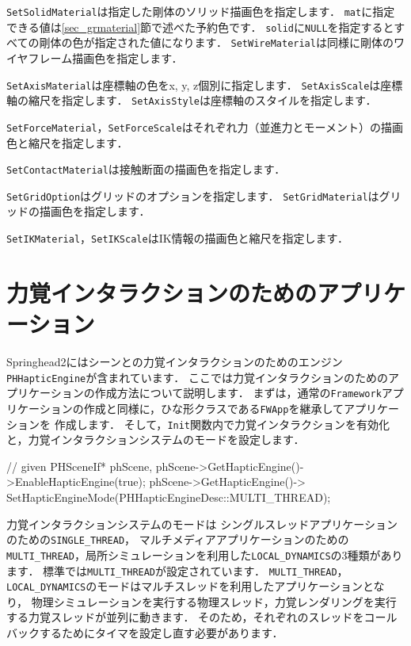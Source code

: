 \texttt{SetSolidMaterial}\KLUDGE は指定した剛体のソリッド描画色を指定します．
\texttt{mat}\KLUDGE に指定できる値は\ref{sec_grmaterial}\KLUDGE 節で述べた予約色です．
\texttt{solid}\KLUDGE に\texttt{NULL}\KLUDGE を指定するとすべての剛体の色が指定された値になります．
\texttt{SetWireMaterial}\KLUDGE は同様に剛体のワイヤフレーム描画色を指定します．

\texttt{SetAxisMaterial}\KLUDGE は座標軸の色をx, y, z\KLUDGE 個別に指定します．
\texttt{SetAxisScale}\KLUDGE は座標軸の縮尺を指定します．
\texttt{SetAxisStyle}\KLUDGE は座標軸のスタイルを指定します．

\texttt{SetForceMaterial}\KLUDGE ，\texttt{SetForceScale}\KLUDGE はそれぞれ力（並進力とモーメント）の描画色と縮尺を指定します．

\texttt{SetContactMaterial}\KLUDGE は接触断面の描画色を指定します．

\texttt{SetGridOption}\KLUDGE はグリッドのオプションを指定します．
\texttt{SetGridMaterial}\KLUDGE はグリッドの描画色を指定します．

\texttt{SetIKMaterial}\KLUDGE ，\texttt{SetIKScale}\KLUDGE はIK\KLUDGE 情報の描画色と縮尺を指定します．


\section{\KLUDGE 力覚インタラクションのためのアプリケーション}
Springhead2\KLUDGE にはシーンとの力覚インタラクションのためのエンジン\texttt{PHHapticEngine}\KLUDGE が含まれています．
\KLUDGE ここでは力覚インタラクションのためのアプリケーションの作成方法について説明します．
\KLUDGE まずは，通常の\texttt{Framework}\KLUDGE アプリケーションの作成と同様に，ひな形クラスである\texttt{FWApp}\KLUDGE を継承してアプリケーションを
\KLUDGE 作成します．
\KLUDGE そして，\texttt{Init}\KLUDGE 関数内で力覚インタラクションを有効化と，力覚インタラクションシステムのモードを設定します．
\begin{sourcecode}
	// given PHSceneIf* phScene,
    phScene->GetHapticEngine()->EnableHapticEngine(true);
    phScene->GetHapticEngine()->
    SetHapticEngineMode(PHHapticEngineDesc::MULTI_THREAD);
\end{sourcecode}
\KLUDGE 力覚インタラクションシステムのモードは
\KLUDGE シングルスレッドアプリケーションのための\texttt{SINGLE\_THREAD}\KLUDGE ，
\KLUDGE マルチメディアアプリケーションのための\texttt{MULTI\_THREAD}\KLUDGE ，局所シミュレーションを利用した\texttt{LOCAL\_DYNAMICS}\KLUDGE の3\KLUDGE 種類があります．
\KLUDGE 標準では\texttt{MULTI\_THREAD}\KLUDGE が設定されています．
\texttt{MULTI\_THREAD}\KLUDGE ，\texttt{LOCAL\_DYNAMICS}\KLUDGE のモードはマルチスレッドを利用したアプリケーションとなり，
\KLUDGE 物理シミュレーションを実行する物理スレッド，力覚レンダリングを実行する力覚スレッドが並列に動きます．
\KLUDGE そのため，それぞれのスレッドをコールバックするためにタイマを設定し直す必要があります．
\clearpage

